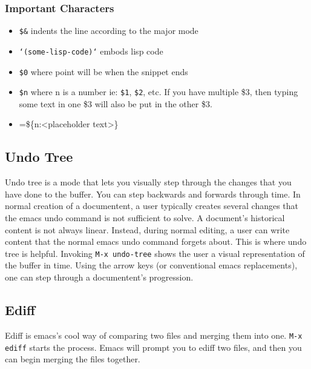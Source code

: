\documentclass[11pt]{article}
\begin{document}
\subsubsection{Important Characters}
\label{sec:orgheadline24}
\begin{itemize}
\item \texttt{\$\&} indents the line according to the major mode
\item \texttt{`(some-lisp-code)`} embods lisp code
\item \texttt{\$0} where point will be when the snippet ends
\item \texttt{\$n} where n is a number ie: \texttt{\$1}, \texttt{\$2}, etc.  If you have multiple \$3, then typing some text in one \$3 will also be put in
the other \$3.
\item =\$\{n:<placeholder text>\}
\end{itemize}
\subsection{Undo Tree}
\label{sec:orgheadline26}
Undo tree is a mode that lets you visually step through the changes that you have done to the buffer.  You can step backwards and forwards through time.  In normal creation of a documentent, a user typically creates several changes that the emacs undo command is not sufficient to solve.  A document's historical content is not always linear.  Instead, during normal editing, a user can write content that the normal emacs undo command forgets about.  This is where undo tree is helpful.  Invoking \texttt{M-x undo-tree} shows the user a visual representation of the buffer in time.  Using the arrow keys (or conventional emacs replacements), one can step through a documentent's progression.
\subsection{Ediff}
\label{sec:orgheadline28}
Ediff is emacs's cool way of comparing two files and merging them into one.  \texttt{M-x ediff} starts the process.  Emacs will prompt you to ediff two files, and then you can begin merging the files together.
\end{document}
